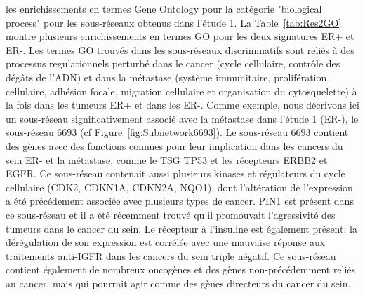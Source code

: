 			 les enrichissements en termes Gene Ontology pour la catégorie "biological process" pour les sous-réseaux obtenus dans l'étude 1.
			La Table~\ref{tab:Res2GO} montre plusieurs enrichissements en termes \acs{GO} pour les deux signatures ER+ et ER-.
			Les termes \acs{GO} trouvés dans les sous-réseaux discriminatifs sont reliés à des processus regulationnels perturbé dans le cancer (cycle cellulaire, contrôle des dégâts de l'ADN) et dans la métastase (système immunitaire, prolifération cellulaire, adhésion focale, migration cellulaire et organisation du cytosquelette) à la fois dans les tumeurs ER+ et dans les ER-. 
			Comme exemple, nous décrivons ici un sous-réseau significativement associé avec la métastase dans l'étude 1 (ER-), le sous-réseau 6693 (cf Figure~\ref{fig:Subnetwork6693}).
			Le sous-réseau 6693 contient des gènes avec des fonctions connues pour leur implication dans les cancers du sein ER- et la métastase, comme le \acs{TSG} \acs{TP53} et les récepteurs \acs{ERBB2} et \acs{EGFR}.
			Ce sous-réseau contenait aussi plusieurs kinases et régulateurs du cycle cellulaire (\acs{CDK2}, \acs{CDKN1A}, \acs{CDKN2A}, \acs{NQO1}), dont l'altération de l'expression a été précédement associée avec plusieurs types de cancer.
			\acs{PIN1} est présent dans ce sous-réseau et il a été récemment trouvé qu'il promouvait l'agressivité des tumeurs dans le cancer du sein.
			Le récepteur à l'insuline est également présent; la dérégulation de son expression est corrélée avec une mauvaise réponse aux traitements anti-\acs{IGFR} dans les cancers du sein triple négatif.
			Ce sous-réseau contient également de nombreux oncogènes et des gènes non-précédemment reliés au cancer, mais qui pourrait agir comme des gènes directeurs du cancer du sein.

